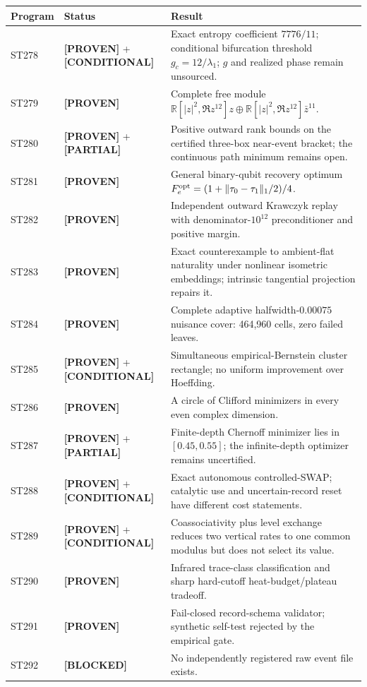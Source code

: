 \documentclass[11pt,a4paper]{article}
\newcommand{\Proven}{\textcolor{proved}{\textbf{[PROVEN]}}}
\newcommand{\Conditional}{\textcolor{conditional}{\textbf{[CONDITIONAL]}}}
\newcommand{\Partial}{\textcolor{conditional}{\textbf{[PARTIAL]}}}
\newcommand{\Blocked}{\textcolor{blocked}{\textbf{[BLOCKED]}}}
\begin{document}
\small
\begin{longtable}{p{}p{}p{}}
\toprule
Program & Status & Result \\
\midrule\endhead
ST278 & \Proven{} + \Conditional & Exact entropy coefficient $7776/11$; conditional
bifurcation threshold $g_c=12/\lambda_1$; $g$ and realized phase remain unsourced. \\
ST279 & \Proven & Complete free module
$\mathbb R[|z|^2,\Re z^{12}]z\oplus
\mathbb R[|z|^2,\Re z^{12}]\bar z^{11}$. \\
ST280 & \Proven{} + \Partial & Positive outward rank bounds on the certified three-box
near-event bracket; the continuous path minimum remains open. \\
ST281 & \Proven & General binary-qubit recovery optimum
$F_e^{\rm opt}=(1+\|\tau_0-\tau_1\|_1/2)/4$. \\
ST282 & \Proven & Independent outward Krawczyk replay with denominator-$10^{12}$
preconditioner and positive margin. \\
ST283 & \Proven & Exact counterexample to ambient-flat naturality under nonlinear
isometric embeddings; intrinsic tangential projection repairs it. \\
ST284 & \Proven & Complete adaptive halfwidth-$0.00075$ nuisance cover: 464,960 cells,
zero failed leaves. \\
ST285 & \Proven{} + \Conditional & Simultaneous empirical-Bernstein cluster rectangle;
no uniform improvement over Hoeffding. \\
ST286 & \Proven & A circle of Clifford minimizers in every even complex dimension. \\
ST287 & \Proven{} + \Partial & Finite-depth Chernoff minimizer lies in $[0.45,0.55]$;
the infinite-depth optimizer remains uncertified. \\
ST288 & \Proven{} + \Conditional & Exact autonomous controlled-SWAP; catalytic use and
uncertain-record reset have different cost statements. \\
ST289 & \Proven{} + \Conditional & Coassociativity plus level exchange reduces two
vertical rates to one common modulus but does not select its value. \\
ST290 & \Proven & Infrared trace-class classification and sharp hard-cutoff
heat-budget/plateau tradeoff. \\
ST291 & \Proven & Fail-closed record-schema validator; synthetic self-test rejected by
the empirical gate. \\
ST292 & \Blocked & No independently registered raw event file exists. \\
\bottomrule
\end{longtable}
\normalsize
\end{document}
